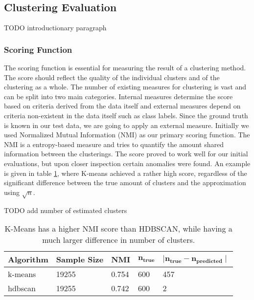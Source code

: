\subsection{Clustering Evaluation}

TODO introductionary paragraph

\subsubsection{Scoring Function}

The scoring function is essential for measuring the result of a clustering method. The score should reflect the quality of the individual clusters and of the clustering as a whole. The number of existing measures for clustering is vast and can be split into two main categories. Internal measures determine the score based on criteria derived from the data itself and external measures depend on criteria non-existent in the data itself such as class labels. Since the ground truth is known in our test data, we are going to apply an external measure.
Initially we used Normalized Mutual Information (NMI) as our primary scoring function. The NMI is a entropy-based measure and tries to quantify the amount shared information between the clusterings. The score proved to work well for our initial evaluations, but upon closer inspection certain anomalies were found. An example is given in table \ref{tab:nmi_kmeans_example}, where K-means achieved a rather high score, regardless of the significant difference between the true amount of clusters and the approximation using $\sqrt{n}$.


TODO add number of estimated clusters
\begin{table}[h]
    \centering
    \begin{tabular}{|l|l|l|l|l|}
    \hline
    \textbf{Algorithm} & \textbf{Sample Size} & \textbf{NMI}  & $\mathbf{n_{true}}$ & $\mathbf{ \mid n_{true} - n_{predicted} \mid }$ \\ \hline
    k-means & 19255 & 0.754 & 600 & 457 \\ \hline
    hdbscan & 19255 & 0.742 & 600 & 2 \\ \hline
    \end{tabular}
    \caption{K-Means has a higher NMI score than HDBSCAN, while having a much larger difference in number of clusters.}
    \label{tab:nmi_kmeans_example}
\end{table}

